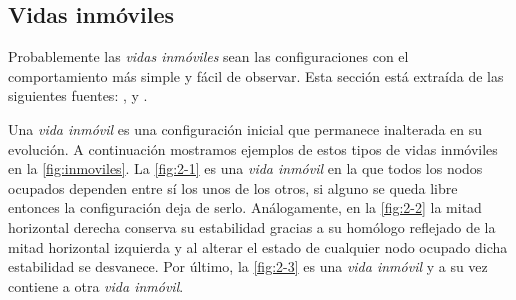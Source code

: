 \documentclass[../proyecto.tex]{memoir}
\begin{document}
\subsection{Vidas inmóviles}
Probablemente las \textit{vidas inmóviles} sean las configuraciones con el comportamiento más simple y fácil de observar. Esta sección está extraída de las siguientes fuentes: \cite{stillLifeProblem},\cite{stillLifeTheory} y \cite{LikeWikiStill}.


Una \textit{vida inmóvil} es una configuración inicial que permanece inalterada en su evolución. A continuación mostramos ejemplos de estos tipos de vidas inmóviles en la \autoref{fig:inmoviles}. La \autoref{fig:2-1} es una \textit{vida inmóvil} en la que todos los nodos ocupados dependen entre sí los unos de los otros, si alguno se queda libre entonces la configuración deja de serlo. Análogamente, en la \autoref{fig:2-2} la mitad horizontal derecha conserva su estabilidad gracias a su homólogo reflejado de la mitad horizontal izquierda y al alterar el estado de cualquier nodo ocupado dicha estabilidad se desvanece. Por último, la \autoref{fig:2-3} es una \textit{vida inmóvil} y a su vez contiene a otra \textit{vida inmóvil}.
\end{document}
